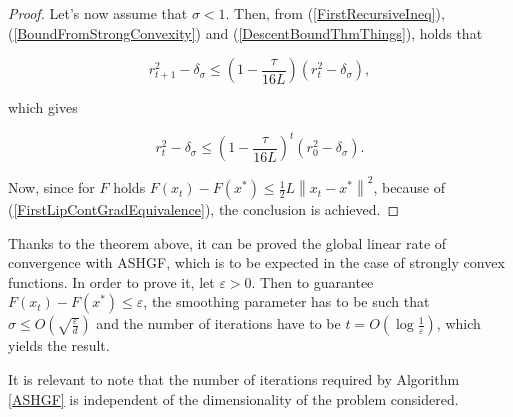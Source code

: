 \begin{proof}
Let's now assume that $\sigma < 1$. Then, from (\ref{FirstRecursiveIneq}), (\ref{BoundFromStrongConvexity}) and (\ref{DescentBoundThmThings}), holds that

\begin{equation}
	r_{t+1}^{2}-\delta_{\sigma} \leq\left(1-\frac{\tau}{16 L}\right)\left(r_{t}^{2}-\delta_{\sigma}\right), 
\end{equation}

which gives

\begin{equation}
	r_{t}^{2}-\delta_{\sigma} \leq\left(1-\frac{\tau}{16 L}\right)^{t}\left(r_{0}^{2}-\delta_{\sigma}\right) . 
\end{equation}

Now, since for $F$ holds \( F\left(x_{t}\right)-F\left(x^{*}\right) \leq \frac{1}{2} L\left\|x_{t}-x^{*}\right\|^{2} \), because of (\ref{FirstLipContGradEquivalence}), the conclusion is achieved.

\end{proof}

Thanks to the theorem above, it can be proved the global linear rate of convergence with ASHGF, which is to be expected in the case of strongly convex functions. In order to prove it, let $\varepsilon >0$. Then to guarantee $ F\left(x_{t}\right)-F\left(x^{*}\right) \leq \varepsilon $, the smoothing parameter has to be such that $\sigma \leq O\left(\sqrt{\frac{\varepsilon}{d}}\right)$ and the number of iterations have to be $t = O(\log\frac{1}{\varepsilon})$, which yields the result.

It is relevant to note that the number of iterations required by Algorithm \ref{ASHGF} is independent of the dimensionality of the problem considered.